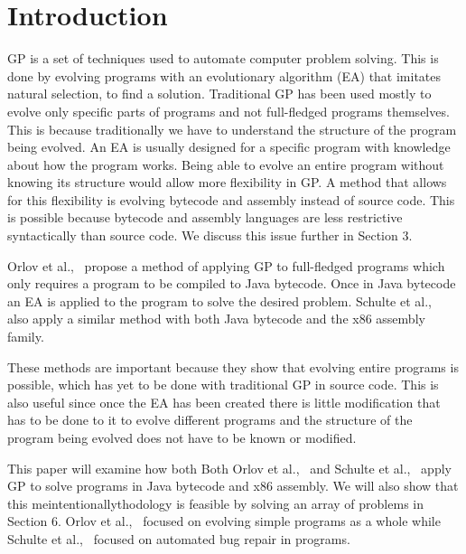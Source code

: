 \documentclass{sig-alternate}
\begin{document}

\section{Introduction}
GP is a set of techniques used to automate computer problem solving. This is done by evolving programs with an evolutionary algorithm (EA) that imitates natural selection, to find a solution. Traditional GP has been used mostly to evolve only specific parts of programs and not full-fledged programs themselves. This is because traditionally we have to understand the structure of the program being evolved. An EA is usually designed for a specific program with knowledge about how the program works. Being able to evolve an entire program without knowing its structure would allow more flexibility in GP. A method that allows for this flexibility is evolving bytecode and assembly instead of source code. This is possible because bytecode and assembly languages are less restrictive syntactically than source code. We discuss this issue further in Section 3.\par 

Orlov et al.,~\cite{FINCH2:2009} propose a method of applying GP to full-fledged programs which only requires a program to be compiled to Java bytecode. Once in Java bytecode an EA is applied to the program to solve the desired problem. Schulte et al.,~\cite{Assembly:2010} also apply a similar method with both Java bytecode and the x86 assembly family.

These methods are important because they show that evolving entire programs is possible, which has yet to be done with traditional GP in source code. This is also useful since once the EA has been created there is little modification that has to be done to it to evolve different programs and the structure of the program being evolved does not have to be known or modified.\par

	This paper will examine how both Both Orlov et al.,~\cite{FINCH:2011} and Schulte et al.,~\cite{Assembly:2010} apply GP to solve programs in Java bytecode and x86 assembly. We will also show that this meintentionallythodology is feasible by solving an array of problems in Section 6. Orlov et al.,~\cite{FINCH:2011} focused on evolving simple programs as a whole while Schulte et al.,~\cite{Assembly:2010} focused on automated bug repair in programs.\par
	
\end{document}
